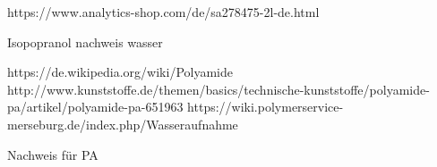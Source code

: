 



https://www.analytics-shop.com/de/sa278475-2l-de.html

Isopopranol nachweis wasser


https://de.wikipedia.org/wiki/Polyamide
http://www.kunststoffe.de/themen/basics/technische-kunststoffe/polyamide-pa/artikel/polyamide-pa-651963
https://wiki.polymerservice-merseburg.de/index.php/Wasseraufnahme

Nachweis für PA